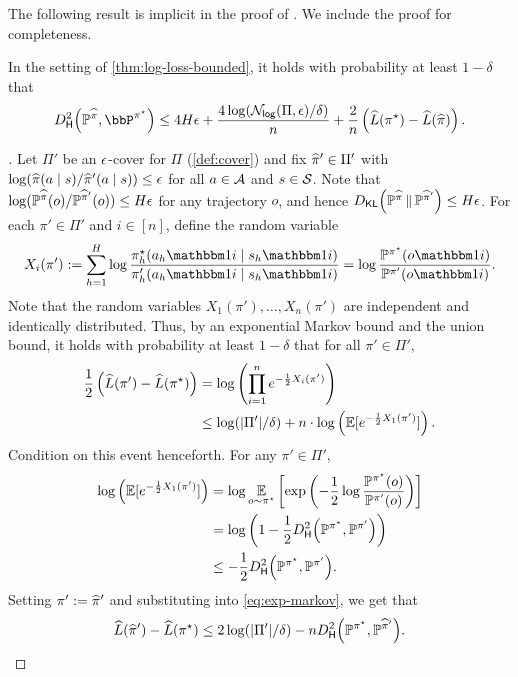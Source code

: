 The following result is implicit in the proof of \citet[Proposition B.1]{foster2024behavior}. We include the proof for completeness.

\begin{lemma}\label{lemma:hels-to-lhat}
In the setting of \cref{thm:log-loss-bounded}, it holds with probability at least $1-\delta$ that 
\[\Dhels{\BP^{\pihat}}{\bbP^{\pistar}}\leq 4H\epsilon + \frac{4\log(\Nlog(\Pi,\epsilon)/\delta)}{n} + \frac{2}{n}\left(\wh L(\pistar) - \wh L(\pihat)\right).\]
\end{lemma}

\begin{proof}[]
Let $\Pi'$ be an $\epsilon$-cover for $\Pi$ (\cref{def:cover}) and fix $\widehat{\pi}' \in \Pi'$ with $\log(\widehat{\pi}(a\mid{}s)/\widehat{\pi}'(a\mid{}s)) \leq \epsilon$ for all $a\in\mathcal{A}$ and $s\in\mathcal{S}$. Note that $\log(\mathbb{P}^{\widehat{\pi}}(o)/\mathbb{P}^{\widehat{\pi}'}(o)) \leq H\epsilon$ for any trajectory $o$, and hence $\Dkl{\BP^{\pihat}}{\BP^{\pihat'}} \leq H\epsilon$. For each $\pi'\in\Pi'$ and $i \in [n]$, define the random variable
\[X_i(\pi') := \sum_{h=1}^H \log \frac{\pistarhi}{\piphi} = \log \frac{\BP^{\pistar}(o\ind{i})}{\BP^{\pi'}(o\ind{i})}.\]
Note that the random variables $X_1(\pi'),\dots,X_n(\pi')$ are independent and identically distributed. Thus, by an exponential Markov bound and the union bound, it holds with probability at least $1-\delta$ that for all $\pi'\in\Pi'$,
\begin{align}
\frac{1}{2}\left(\widehat{L}(\pi') - \widehat{L}(\pi^{\star})\right)
&= \log\left(\prod_{i=1}^n e^{-\frac{1}{2}X_i(\pi')}\right) \\ 
&\leq \log(|\Pi'|/\delta) + n\cdot \log\left(\operatorname*{\mathbb{E}}[e^{-\frac{1}{2}X_1(\pi')}]\right).\label{eq:exp-markov}
\end{align}
Condition on this event henceforth. For any $\pi'\in\Pi'$,
\begin{align}
\log\left(\EE[e^{-\frac{1}{2}X_1(\pi')}]\right) 
&= \log \EE_{o\sim\pistar}\left[\exp\left(-\frac{1}{2} \log \frac{\BP^{\pistar}(o)}{\BP^{\pi'}(o)}\right)\right]\\ 
&= \log\left(1 - \frac{1}{2}\Dhels{\BP^{\pistar}}{\BP^{\pi'}}\right) \\ 
&\leq -\frac{1}{2} \Dhels{\BP^{\pistar}}{\BP^{\pi'}}.
\end{align}
Setting $\pi' := \widehat{\pi}'$ and substituting into \cref{eq:exp-markov}, we get that
\begin{equation} \wh L(\pihat') - \wh L(\pistar) \leq 2\log(|\Pi'|/\delta) - n\Dhels{\BP^{\pistar}}{\BP^{\pihat'}}.\label{eq:piphat-bound}\end{equation}

\end{proof}
